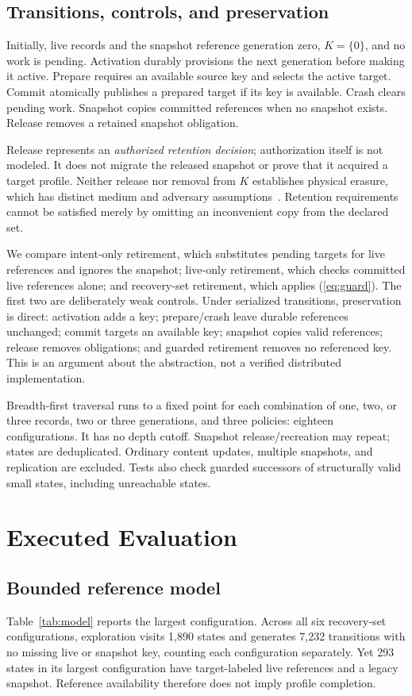 \documentclass[10pt,conference]{IEEEtran}
\begin{document}
\subsection{Transitions, controls, and preservation}
Initially, live records and the snapshot reference generation zero, $K=\{0\}$, and no work is pending. Activation durably provisions the next generation before making it active. Prepare requires an available source key and selects the active target. Commit atomically publishes a prepared target if its key is available. Crash clears pending work. Snapshot copies committed references when no snapshot exists. Release removes a retained snapshot obligation.

Release represents an \emph{authorized retention decision}; authorization itself is not modeled. It does not migrate the released snapshot or prove that it acquired a target profile. Neither release nor removal from $K$ establishes physical erasure, which has distinct medium and adversary assumptions~\cite{deletion}. Retention requirements cannot be satisfied merely by omitting an inconvenient copy from the declared set.

We compare intent-only retirement, which substitutes pending targets for live references and ignores the snapshot; live-only retirement, which checks committed live references alone; and recovery-set retirement, which applies (\ref{eq:guard}). The first two are deliberately weak controls. Under serialized transitions, preservation is direct: activation adds a key; prepare/crash leave durable references unchanged; commit targets an available key; snapshot copies valid references; release removes obligations; and guarded retirement removes no referenced key. This is an argument about the abstraction, not a verified distributed implementation.

Breadth-first traversal runs to a fixed point for each combination of one, two, or three records, two or three generations, and three policies: eighteen configurations. It has no depth cutoff. Snapshot release/recreation may repeat; states are deduplicated. Ordinary content updates, multiple snapshots, and replication are excluded. Tests also check guarded successors of structurally valid small states, including unreachable states.

\section{Executed Evaluation}
\subsection{Bounded reference model}
Table~\ref{tab:model} reports the largest configuration. Across all six recovery-set configurations, exploration visits 1,890 states and generates 7,232 transitions with no missing live or snapshot key, counting each configuration separately. Yet 293 states in its largest configuration have target-labeled live references and a legacy snapshot. Reference availability therefore does not imply profile completion.
\end{document}
